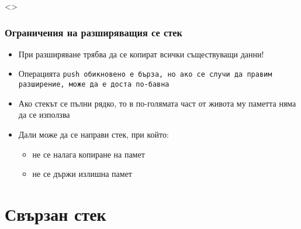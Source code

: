 \documentclass[alsotrans, beameroptions={aspectratio=169}]{beamerswitch}
\begin{document}
\begin{frame}<>
  \frametitle{Ограничения на разширяващия се стек}

  \begin{itemize}[<+->]
  \item При разширяване трябва да се копират всички съществуващи данни!
  \item Операцията \tt{push} обикновено е бърза, но ако се случи да правим разширение, може да е доста по-бавна
  \item Ако стекът се пълни рядко, то в по-голямата част от живота му паметта няма да се използва
  \item Дали може да се направи стек, при който:
    \begin{itemize}
    \item не се налага копиране на памет
    \item не се държи излишна памет
    \end{itemize}
  \end{itemize}
\end{frame}

\section{Свързан стек}
\end{document}
